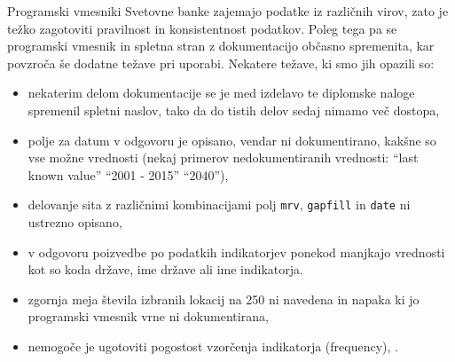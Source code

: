 Programski vmesniki Svetovne banke zajemajo podatke iz različnih virov, zato je
težko zagotoviti pravilnost in konsistentnost podatkov. Poleg tega pa se 
programski vmesnik in spletna stran z dokumentacijo občasno spremenita, kar
povzroča še dodatne težave pri uporabi. Nekatere težave, ki smo jih opazili
so:
\begin{itemize}  
\item nekaterim delom dokumentacije se je med izdelavo te diplomske naloge
  spremenil spletni naslov, tako da do tistih delov sedaj nimamo več dostopa,
\item polje za datum v odgovoru je opisano, vendar ni dokumentirano, kakšne so
    vse možne vrednosti (nekaj primerov nedokumentiranih vrednosti:
    ``last known value'' ``2001 - 2015'' ``2040''),
\item delovanje sita z različnimi kombinacijami polj \verb|mrv|, \verb|gapfill|
  in \verb|date| ni ustrezno opisano,
\item v odgovoru poizvedbe po podatkih indikatorjev ponekod manjkajo vrednosti
  kot so koda države, ime države ali ime indikatorja.
\item zgornja meja števila izbranih lokacij na 250 ni navedena in napaka 
  ki jo programski vmesnik vrne ni dokumentirana,
\item nemogoče je ugotoviti pogostost vzorčenja indikatorja (frequency), .
\end{itemize}  







